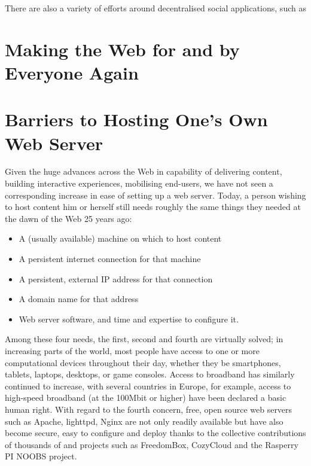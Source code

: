 \documentclass{amsart}
\begin{document}
There are also a variety of efforts around decentralised social applications, such as 

\section{Making the Web for and by Everyone Again}



\section{Barriers to Hosting One's Own Web Server}

Given the huge advances across the Web in capability of delivering content, building interactive experiences, mobilising end-users, we have not seen a corresponding increase in ease of setting up a web server.  Today, a person wishing to host content him or herself still needs roughly the same things they needed at the dawn of the Web 25 years ago:

\begin{itemize}
\item A (usually available) machine on which to host content
\item A persistent internet connection for that machine
\item A persistent, external IP address for that connection
\item A domain name for that address
\item Web server software, and time and expertise to configure it.
\end{itemize}

Among these four needs, the first, second and fourth are virtually solved; in increasing parts of the world, most people have access to one or more computational devices throughout their day, whether they be smartphones, tablets, laptops, desktops, or game consoles.  Access to broadband has similarly continued to increase, with several countries in Europe, for example, access to high-speed broadband (at the 100Mbit or higher) have been declared a basic human right.  With regard to the fourth concern, free, open source web servers such as Apache, lighttpd, Nginx are not only readily available but have also become secure, easy to configure and deploy thanks to the collective contributions of thousands of and projects such as FreedomBox, CozyCloud and the Rasperry PI NOOBS project. 
\end{document}
